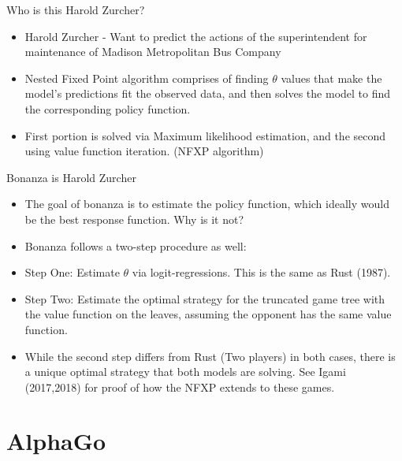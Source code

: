 \documentclass[presentation]{beamer}
\begin{document}
\begin{frame}[label={sec:org0134679}]{Who is this Harold Zurcher?}
\begin{itemize}
\item Harold Zurcher - Want to predict the actions of the superintendent
for maintenance of Madison Metropolitan Bus Company
\end{itemize}

\begin{itemize}
\item Nested Fixed Point algorithm comprises of finding \(\theta\) values that
make the model's predictions fit the observed data, and then solves
the model to find the corresponding policy function.
\item First portion is solved via Maximum likelihood estimation, and the
second using value function iteration. (NFXP algorithm)
\end{itemize}
\end{frame}

\begin{frame}[label={sec:org86d6eb6}]{Bonanza is Harold Zurcher}
\begin{itemize}
\item The goal of bonanza is to estimate the policy function, which
ideally would be the best response function. Why is it not?
\item Bonanza follows a two-step procedure as well:
\item Step One: Estimate \(\theta\) via logit-regressions. This is the same as
Rust (1987).
\item Step Two: Estimate the optimal strategy for the truncated game tree
with the value function on the leaves, assuming the opponent has the
same value function.
\item While the second step differs from Rust (Two players) in both cases,
there is a unique optimal strategy that both models are solving. See
Igami (2017,2018) for proof of how the NFXP extends to these games.
\end{itemize}
\end{frame}

\section{AlphaGo}
\label{sec:org5ee4e25}
\end{document}
